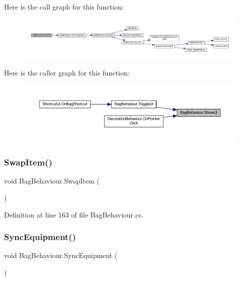 Here is the call graph for this function\+:
\nopagebreak
\begin{figure}[H]
\begin{center}
\leavevmode
\includegraphics[width=350pt]{class_bag_behaviour_aed83310e460fbfb0fa033cfd9fa41ba5_cgraph}
\end{center}
\end{figure}
Here is the caller graph for this function\+:
\nopagebreak
\begin{figure}[H]
\begin{center}
\leavevmode
\includegraphics[width=350pt]{class_bag_behaviour_aed83310e460fbfb0fa033cfd9fa41ba5_icgraph}
\end{center}
\end{figure}
\mbox{\label{class_bag_behaviour_addf36803ab1e8f36c33054666a9b7618}} 
\subsubsection{\texorpdfstring{SwapItem()}{SwapItem()}}
{\footnotesize\ttfamily void Bag\+Behaviour.\+Swap\+Item (\begin{DoxyParamCaption}{ }\end{DoxyParamCaption})}



Definition at line 163 of file Bag\+Behaviour.\+cs.

\mbox{\label{class_bag_behaviour_ab7a8add6e04a204513a05f0d312df676}} 
\subsubsection{\texorpdfstring{SyncEquipment()}{SyncEquipment()}}
{\footnotesize\ttfamily void Bag\+Behaviour.\+Sync\+Equipment (\begin{DoxyParamCaption}{ }\end{DoxyParamCaption})}



